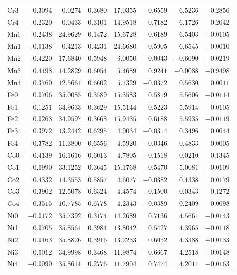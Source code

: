 \begin{table}[H]
{\begin{tabular}{lrrrrrrr}
Cr3 &$-0.3094$ &$0.0274$ &$0.3680$ &$17.0355$ &$0.6559$ &$6.5236$ &$0.2856$ \\
Cr4 &$-0.2320$ &$0.0433$ &$0.3101$ &$14.9518$ &$0.7182$ &$6.1726$ &$0.2042$ \\
Mn0 &$0.2438$ &$24.9629$ &$0.1472$ &$15.6728$ &$0.6189$ &$6.5403$ &$-0.0105$ \\
Mn1 &$-0.0138$ &$0.4213$ &$0.4231$ &$24.6680$ &$0.5905$ &$6.6545$ &$-0.0010$ \\
Mn2 &$0.4220$ &$17.6840$ &$0.5948$ &$6.0050$ &$0.0043$ &$-0.6090$ &$-0.0219$ \\
Mn3 &$0.4198$ &$14.2829$ &$0.6054$ &$5.4689$ &$0.9241$ &$-0.0088$ &$-0.9498$ \\
Mn4 &$0.3760$ &$12.5661$ &$0.6602$ &$5.1329$ &$-0.0372$ &$0.5630$ &$0.0011$ \\
Fe0 &$0.0706$ &$35.0085$ &$0.3589$ &$15.3583$ &$0.5819$ &$5.5606$ &$-0.0114$ \\
Fe1 &$0.1251$ &$34.9633$ &$0.3629$ &$15.5144$ &$0.5223$ &$5.5914$ &$-0.0105$ \\
Fe2 &$0.0263$ &$34.9597$ &$0.3668$ &$15.9435$ &$0.6188$ &$5.5935$ &$-0.0119$ \\
Fe3 &$0.3972$ &$13.2442$ &$0.6295$ &$4.9034$ &$-0.0314$ &$0.3496$ &$0.0044$ \\
Fe4 &$0.3782$ &$11.3800$ &$0.6556$ &$4.5920$ &$-0.0346$ &$0.4833$ &$0.0005$ \\
Co0 &$0.4139$ &$16.1616$ &$0.6013$ &$4.7805$ &$-0.1518$ &$0.0210$ &$0.1345$ \\
Co1 &$0.0990$ &$33.1252$ &$0.3645$ &$15.1768$ &$0.5470$ &$5.0081$ &$-0.0109$ \\
Co2 &$0.4332$ &$14.3553$ &$0.5857$ &$4.6077$ &$-0.0382$ &$0.1338$ &$0.0179$ \\
Co3 &$0.3902$ &$12.5078$ &$0.6324$ &$4.4574$ &$-0.1500$ &$0.0343$ &$0.1272$ \\
Co4 &$0.3515$ &$10.7785$ &$0.6778$ &$4.2343$ &$-0.0389$ &$0.2409$ &$0.0098$ \\
Ni0 &$-0.0172$ &$35.7392$ &$0.3174$ &$14.2689$ &$0.7136$ &$4.5661$ &$-0.0143$ \\
Ni1 &$0.0705$ &$35.8561$ &$0.3984$ &$13.8042$ &$0.5427$ &$4.3965$ &$-0.0118$ \\
Ni2 &$0.0163$ &$35.8826$ &$0.3916$ &$13.2233$ &$0.6052$ &$4.3388$ &$-0.0133$ \\
Ni3 &$0.0012$ &$34.9998$ &$0.3468$ &$11.9874$ &$0.6667$ &$4.2518$ &$-0.0148 $ \\
Ni4 &$-0.0090$ &$35.8614$ &$0.2776$ &$11.7904$ &$0.7474$ &$4.2011$ &$-0.0163$ \\

\end{tabular}}
\end{table}
